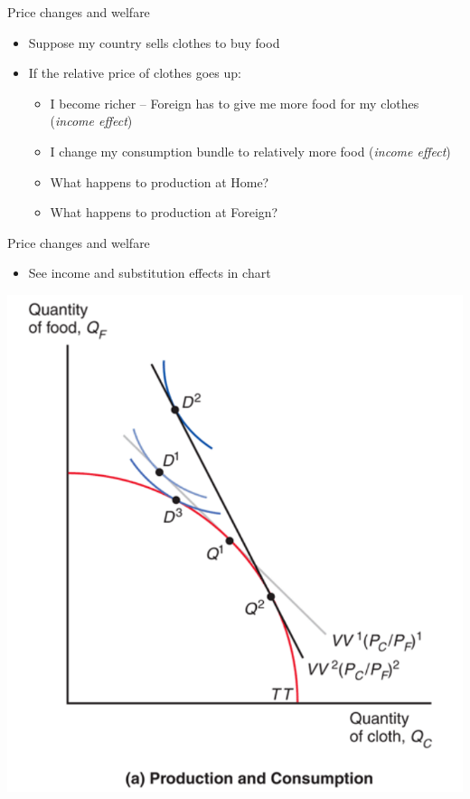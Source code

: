 \documentclass[ignorenonframetext,]{beamer}
\begin{document}
\begin{frame}{Price changes and welfare}

    \begin{itemize}
        \item Suppose my country sells clothes to buy food
        \item If the relative price of clothes goes up:
        \begin{itemize}
            \item I become richer -- Foreign has to give me more food for my clothes (\emph{income effect})
            \item I change my consumption bundle to relatively more food (\emph{income effect})
            \item What happens to production at Home?
            \item What happens to production at Foreign?
        \end{itemize}
    \end{itemize}

\end{frame}

\begin{frame}{Price changes and welfare}

    \begin{itemize}
        \item See income and substitution effects in chart
    \end{itemize}
    \includegraphics[scale=0.25]{price_change_demand.png}

\end{frame}
\end{document}
